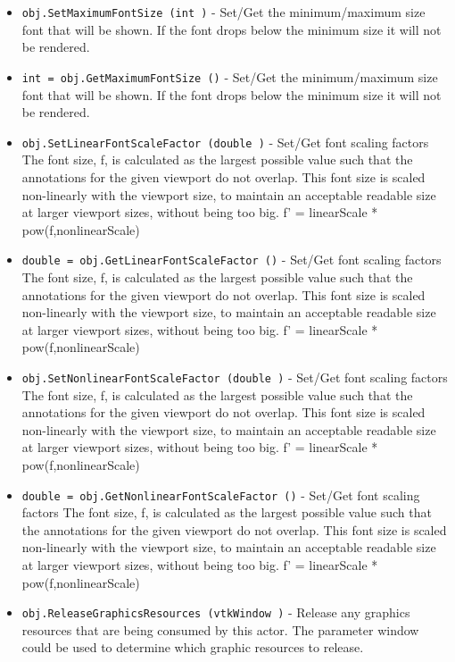 \begin{itemize}
\item  \verb|obj.SetMaximumFontSize (int )| -  Set/Get the minimum/maximum size font that will be shown.
 If the font drops below the minimum size it will not be rendered.

\item  \verb|int = obj.GetMaximumFontSize ()| -  Set/Get the minimum/maximum size font that will be shown.
 If the font drops below the minimum size it will not be rendered.

\item  \verb|obj.SetLinearFontScaleFactor (double )| -  Set/Get font scaling factors
 The font size, f, is calculated as the largest possible value
 such that the annotations for the given viewport do not overlap. 
 This font size is scaled non-linearly with the viewport size,
 to maintain an acceptable readable size at larger viewport sizes, 
 without being too big.
 f' = linearScale * pow(f,nonlinearScale)

\item  \verb|double = obj.GetLinearFontScaleFactor ()| -  Set/Get font scaling factors
 The font size, f, is calculated as the largest possible value
 such that the annotations for the given viewport do not overlap. 
 This font size is scaled non-linearly with the viewport size,
 to maintain an acceptable readable size at larger viewport sizes, 
 without being too big.
 f' = linearScale * pow(f,nonlinearScale)

\item  \verb|obj.SetNonlinearFontScaleFactor (double )| -  Set/Get font scaling factors
 The font size, f, is calculated as the largest possible value
 such that the annotations for the given viewport do not overlap. 
 This font size is scaled non-linearly with the viewport size,
 to maintain an acceptable readable size at larger viewport sizes, 
 without being too big.
 f' = linearScale * pow(f,nonlinearScale)

\item  \verb|double = obj.GetNonlinearFontScaleFactor ()| -  Set/Get font scaling factors
 The font size, f, is calculated as the largest possible value
 such that the annotations for the given viewport do not overlap. 
 This font size is scaled non-linearly with the viewport size,
 to maintain an acceptable readable size at larger viewport sizes, 
 without being too big.
 f' = linearScale * pow(f,nonlinearScale)

\item  \verb|obj.ReleaseGraphicsResources (vtkWindow )| -  Release any graphics resources that are being consumed by this actor.
 The parameter window could be used to determine which graphic
 resources to release.


\end{itemize}
